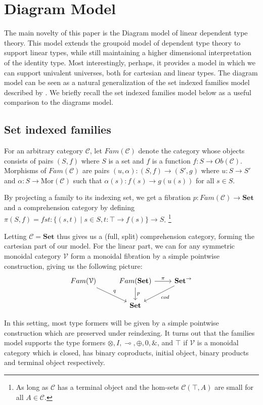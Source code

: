 \documentclass[a4paper,english]{lipics-v2018}
\begin{document}
\section{Diagram Model}\label{models}
The main novelty of this paper is the Diagram model of linear dependent type theory. This model extends the groupoid model of dependent type theory \cite{hofmann1998} to support linear types, while still maintaining a higher dimensional interpretation of the identity type. Most interestingly, perhaps, it provides a model in which we can support univalent universes, both for cartesian and linear types. The diagram model can be seen as a natural generalization of the set indexed families model described by \cite{vakar14}. We briefly recall the set indexed families model below as a useful comparison to the diagrams model.
\subsection{Set indexed families}
\begin{definition}
For an arbitrary category $\mathcal{C}$, let $Fam(\mathcal{C})$ denote the category whose objects consists of pairs $(S, f)$ where $S$ is a set and $f$ is a function $f : S \to Ob(\mathcal{C})$. Morphisms of $Fam(\mathcal{C})$ are pairs $(u, \alpha) : (S, f) \to (S', g)$ where $u : S \to S'$ and $\alpha : S \to \text{Mor}(\mathcal{C})$ such that $\alpha(s) : f(s) \to g(u(s))$ for all $s \in S$.
\end{definition}
By projecting a family to its indexing set, we get a fibration $p : Fam(\mathcal{C}) \to \mathbf{Set}$ and a comprehension category by defining $\pi(S, f) = fst: \{(s, t) \; | \; s \in S, t : \top \to f(s)\} \to S$. \footnote{As long as $\mathcal{C}$ has a terminal object and the hom-sets $\mathcal{C}(\top,A)$ are small for all $A \in \mathcal{C}$.}

Letting $\mathcal{C} = \mathbf{Set}$ thus gives us a (full, split) comprehension category, forming the cartesian part of our model. For the linear part, we can for any symmetric monoidal category $\mathcal{V}$ form a monoidal fibration by a simple pointwise construction, giving us the following picture:
\[
\begin{tikzcd}
Fam(\mathcal{V}) \ar[rd, "q"]  & Fam(\mathbf{Set}) \ar[d, "p"] \ar[r, "\pi"] & \mathbf{Set}^\to \ar[ld, "cod"] \\
& \mathbf{Set}
\end{tikzcd}
\]

In this setting, most type formers will be given by a simple pointwise construction which are preserved under reindexing. It turns out that the families model supports the type formers $\otimes, I, \multimap, \oplus, 0, \&$, and $\top$ if $\mathcal{V}$ is a monoidal category which is closed, has binary coproducts, initial object, binary products and terminal object respectively.
\end{document}
